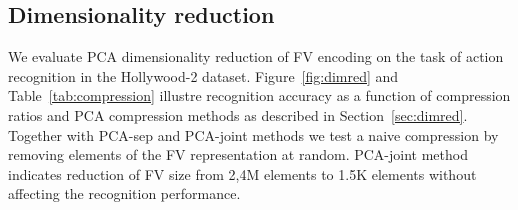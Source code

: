 \documentclass[10pt,twocolumn,letterpaper]{article}
\begin{document}





\subsection{Dimensionality reduction}
\label{sec:dimredexp}
We evaluate PCA dimensionality reduction of FV encoding on the task of action recognition in the Hollywood-2 dataset. Figure~\ref{fig:dimred} and Table~\ref{tab:compression} illustre recognition accuracy as a function of compression ratios and PCA compression methods as described in Section~\ref{sec:dimred}. Together with PCA-sep and PCA-joint methods we test a naive compression by removing elements of the FV representation at random. PCA-joint method indicates reduction of FV size from 2,4M elements to 1.5K elements without affecting the recognition performance.

\end{document}
